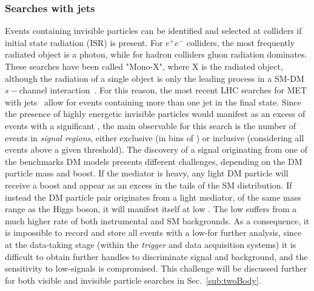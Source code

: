 \subsubsection{Searches with jets}



Events containing invisible particles can be identified and selected at colliders if initial state radiation (ISR) is present. For $e^+e^-$ colliders, the most frequently radiated object is a photon, while for hadron colliders gluon radiation dominates. These searches have been called "Mono-X", where X is the radiated object, although the radiation of a single object is only the leading process in a SM-DM $s-$channel interaction~\cite{Haisch:2013ata}. For this reason, the most recent LHC searches for MET with jets~\cite{Sirunyan:2017jix,Aaboud:2017phn} allow for events containing more than one jet in the final state. Since the presence of highly energetic invisible particles would manifest as an excess of events with a significant \MET, the main observable for this search is the number of events in \MET \textit{signal regions}, either exclusive (in bins of \MET) or inclusive (considering all events above a given \MET threshold). 
The discovery of a signal originating from one of the benchmarks DM models presents different challenges, depending on the DM particle mass and boost. If the mediator is heavy, any light DM particle will receive a boost and appear as an excess in the tails of the SM \MET distribution. If instead the DM particle pair originates from a light mediator, of the same mass range as the Higgs boson, it will manifest itself at low \MET. The low \MET suffers from a much higher rate of both instrumental and SM backgrounds. As a consequence, it is impossible to record and store all events with a low-\MET for further analysis, since at the data-taking stage (within the \textit{trigger} and data acquisition systems) it is difficult to obtain further handles to discriminate signal and background, and the sensitivity to low-\MET signals is compromised. This challenge will be discussed further for both visible and invisible particle searches in Sec.~\ref{sub:twoBody}.

\begin{marginnote}[]
\end{marginnote}

